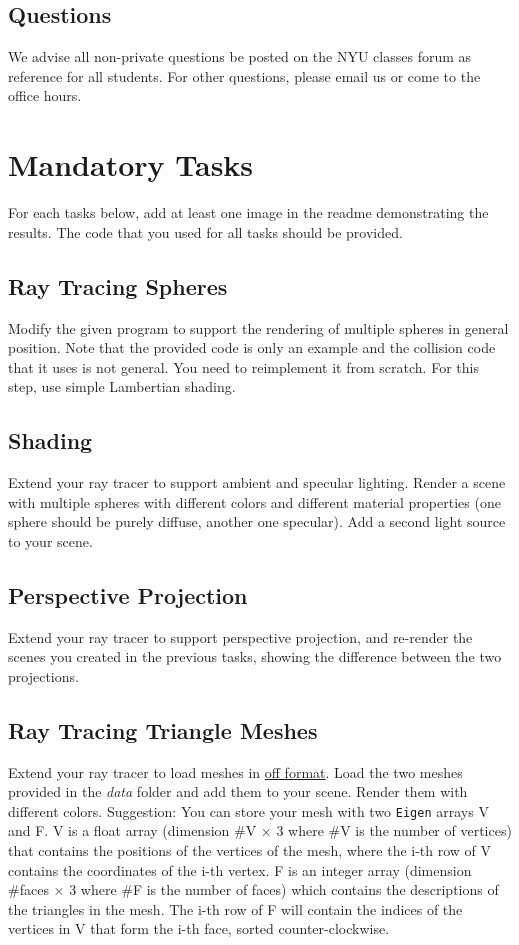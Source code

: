 \documentclass[11pt]{article}
\begin{document}
\subsection*{Questions}

We advise all non-private questions be posted on the NYU classes forum as reference for all students.
For other questions, please email us or come to the office hours.
\section{Mandatory Tasks}
For each tasks below, add at least one image in the readme demonstrating the results. The code that you used for all tasks should be provided.

\subsection{Ray Tracing Spheres}

Modify the given program to support the rendering of multiple spheres in general position. Note that the provided code is only an example and the collision code that it uses is not general. You need to reimplement it from scratch.
For this step, use simple Lambertian shading. 

\subsection{Shading}

Extend your ray tracer to support ambient and specular lighting. Render a scene with multiple spheres with different colors and different material properties (one sphere should be purely diffuse, another one specular).
Add a second light source to your scene.

\subsection{Perspective Projection}

Extend your ray tracer to support perspective projection, and re-render the scenes you created in the previous tasks, showing the difference between the two projections.

\subsection{Ray Tracing Triangle Meshes}

Extend your ray tracer to load meshes in \href{https://en.wikipedia.org/wiki/OFF_(file_format)}{off format}. Load the two meshes provided in the \textit{data} folder and add them to your scene. Render them with different colors. Suggestion: You can store your mesh with two \texttt{Eigen} arrays V and F. V is a float array (dimension \#V $\times$ 3 where \#V is the number of vertices) that contains the positions of the vertices of the mesh, where the i-th row of V contains the coordinates of the i-th vertex. F is an integer array (dimension \#faces $\times$ 3 where \#F is the number of faces) which contains the descriptions of the triangles in the mesh. The i-th row of F will contain the indices of the vertices in V that form the i-th face, sorted counter-clockwise.
\end{document}

